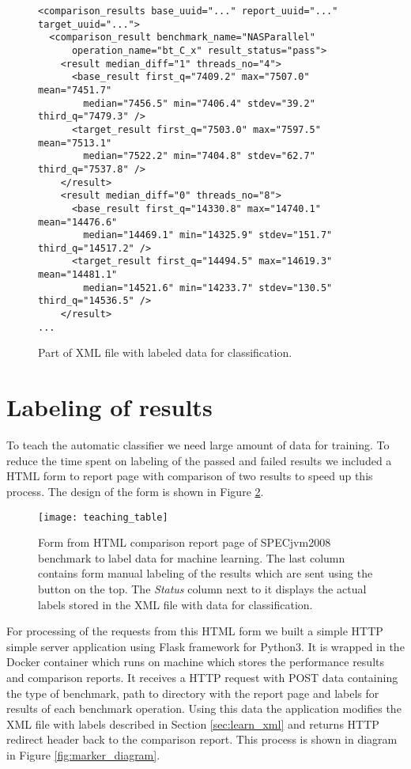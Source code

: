 \begin{figure}
  \small
  \begin{verbatim}
<comparison_results base_uuid="..." report_uuid="..." target_uuid="...">
  <comparison_result benchmark_name="NASParallel"
      operation_name="bt_C_x" result_status="pass">
    <result median_diff="1" threads_no="4">
      <base_result first_q="7409.2" max="7507.0" mean="7451.7"
        median="7456.5" min="7406.4" stdev="39.2" third_q="7479.3" />
      <target_result first_q="7503.0" max="7597.5" mean="7513.1"
        median="7522.2" min="7404.8" stdev="62.7" third_q="7537.8" />
    </result>
    <result median_diff="0" threads_no="8">
      <base_result first_q="14330.8" max="14740.1" mean="14476.6"
        median="14469.1" min="14325.9" stdev="151.7" third_q="14517.2" />
      <target_result first_q="14494.5" max="14619.3" mean="14481.1"
        median="14521.6" min="14233.7" stdev="130.5" third_q="14536.5" />
    </result>
...
  \end{verbatim}
  \normalsize
  \caption{Part of XML file with labeled data for classification.}
  \label{fig:learn_xml}
\end{figure}

\section{Labeling of results}
To teach the automatic classifier we need large amount of data for training. To
reduce the time spent on labeling of the passed and failed results we included a
HTML form to report page with comparison of two results to speed up this
process. The design of the form is shown in Figure \ref{fig:label_form}.

\begin{figure}
  \centering
  \texttt{[image: teaching\_table]}
  \caption{Form from HTML comparison report page of SPECjvm2008 benchmark to
    label data for machine learning. The last column contains form manual
    labeling of the results which are sent using the button on the top. The
    \emph{Status} column next to it displays the actual labels stored in the XML
    file with data for classification.}
  \label{fig:label_form}
\end{figure}

For processing of the requests from this HTML form we built a simple HTTP simple
server application using Flask framework for Python3. It is wrapped in the Docker
container which runs on machine which stores the performance results and
comparison reports. It receives a HTTP request with POST data containing the type of
benchmark, path to directory with the report page and labels for results of each
benchmark operation. Using this data the application modifies the XML file with
labels described in Section \ref{sec:learn_xml} and returns HTTP redirect header
back to the comparison report. This process is shown in diagram in Figure
\ref{fig:marker_diagram}.

